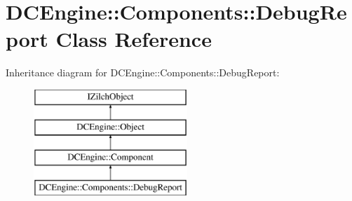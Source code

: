 \hypertarget{classDCEngine_1_1Components_1_1DebugReport}{\section{D\-C\-Engine\-:\-:Components\-:\-:Debug\-Report Class Reference}
\label{classDCEngine_1_1Components_1_1DebugReport}
}
Inheritance diagram for D\-C\-Engine\-:\-:Components\-:\-:Debug\-Report\-:\begin{figure}[H]
\begin{center}
\leavevmode
\includegraphics[height=4.000000cm]{classDCEngine_1_1Components_1_1DebugReport}
\end{center}
\end{figure}
